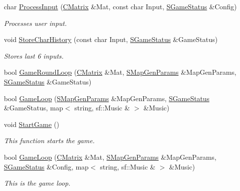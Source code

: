 \begin{DoxyCompactItemize}
char \hyperlink{namespace_chase_game_ab5112517855da810fe3b7bdb81d58484}{Process\-Input} (\hyperlink{namespace_chase_game_a469449f9237e59efce3982127366c550}{C\-Matrix} \&Mat, const char Input, \hyperlink{struct_chase_game_1_1_s_game_status}{S\-Game\-Status} \&Config)
\begin{DoxyCompactList}\small\item\em Processes user input. \end{DoxyCompactList}\item 
void \hyperlink{namespace_chase_game_a4b28a3a3594d145b0ce1d1bf179e88a3}{Store\-Char\-History} (const char Input, \hyperlink{struct_chase_game_1_1_s_game_status}{S\-Game\-Status} \&Game\-Status)
\begin{DoxyCompactList}\small\item\em Stores last 6 inputs. \end{DoxyCompactList}\item 
bool \hyperlink{namespace_chase_game_acb136d1f2b7073d2dc61bc2e2d65b931}{Game\-Round\-Loop} (\hyperlink{namespace_chase_game_a469449f9237e59efce3982127366c550}{C\-Matrix} \&Mat, \hyperlink{struct_chase_game_1_1_s_map_gen_params}{S\-Map\-Gen\-Params} \&Map\-Gen\-Params, \hyperlink{struct_chase_game_1_1_s_game_status}{S\-Game\-Status} \&Game\-Status)
\item 
bool \hyperlink{namespace_chase_game_a1ca6f3f9092b35d9bea0343fd032d7f0}{Game\-Loop} (\hyperlink{struct_chase_game_1_1_s_map_gen_params}{S\-Map\-Gen\-Params} \&Map\-Gen\-Params, \hyperlink{struct_chase_game_1_1_s_game_status}{S\-Game\-Status} \&Game\-Status, map$<$ string, sf\-::\-Music \& $>$ \&Music)
\item 
void \hyperlink{namespace_chase_game_a528073d13296b3cf84a6ae07c3550e74}{Start\-Game} ()
\begin{DoxyCompactList}\small\item\em This function starts the game. \end{DoxyCompactList}\item 
bool \hyperlink{namespace_chase_game_a978204f0ec269a6fa5f43bb523d84e57}{Game\-Loop} (\hyperlink{namespace_chase_game_a469449f9237e59efce3982127366c550}{C\-Matrix} \&Mat, \hyperlink{struct_chase_game_1_1_s_map_gen_params}{S\-Map\-Gen\-Params} \&Map\-Gen\-Params, \hyperlink{struct_chase_game_1_1_s_game_status}{S\-Game\-Status} \&Config, map$<$ string, sf\-::\-Music \& $>$ \&Music)
\begin{DoxyCompactList}\small\item\em This is the game loop. \end{DoxyCompactList}\item 

\end{DoxyCompactItemize}
